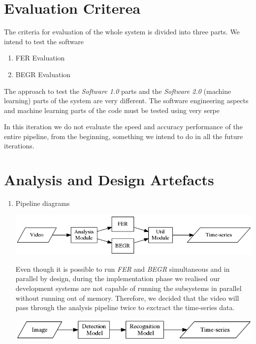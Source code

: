 \documentclass[12pt,a4paper,man]{report}
\begin{document}
\section{Evaluation Criterea}
\label{sec:orge02ab9c}

The criteria for evaluation of the whole system is divided into three parts. We intend to test the software 
\begin{enumerate}
\item FER Evaluation
\item BEGR Evaluation
\end{enumerate}

The approach to test the \emph{Software 1.0} parts and the \emph{Software 2.0} (machine learning) parts of the system are very different.
The software engineering aspects and machine learning parts of the code must be tested using very serpe

In this iteration we do not evaluate the speed and accuracy performance of the entire pipeline, from the beginning, something we intend to do in all the future iterations.


\section{Analysis and Design Artefacts}
\label{sec:org5b53db4}
\begin{enumerate}
\item Pipeline diagrams
\label{sec:org555d3d3}

\begin{center}
\includegraphics[width=.9\linewidth]{img/pipeline.png}
\end{center}


Even though it is possible to run \emph{FER} and \emph{BEGR} simultaneous and in parallel by design, during the implementation phase we realised our development systems are not capable of  running the subsystems in parallel without running out of memory. Therefore, we decided that the video will pass through the analysis pipeline twice to exctract the time-series data.


\begin{center}
\includegraphics[width=.9\linewidth]{img/ferpipeline.png}
\end{center}
\end{enumerate}
\end{document}
